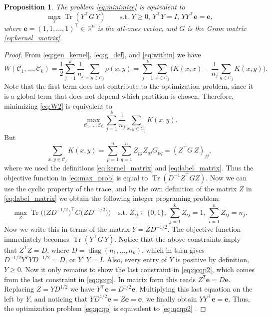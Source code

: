 \documentclass[aps,preprint,nofootinbib,floatfix]{revtex4-1}
\newtheorem{proposition}[theorem]{Proposition}
\DeclareMathOperator{\diag}{diag}
\DeclareMathOperator{\Tr}{Tr}
\newcommand\kk{K}
\newcommand\C{{\mathcal{C}}}
\newcommand\Zt{Y}
\begin{document}
\begin{proposition} 
\label{th:qcqp2}
The problem \eqref{eq:minimize} is equivalent to
\begin{equation}
\label{eq:qcqp2}
\max_{\Zt} \Tr \left( \Zt^\top G \, \Zt \right)  \qquad
\mbox{s.t. $\Zt \ge 0$, $\Zt^\top \Zt = I$, 
$\Zt \Zt^\top \bm{e} = \bm{e}$},
\end{equation}
where $\bm{e} = (1,1,\dots,1)^\top \in \mathbb{R}^n$ is the all-ones vector,
and $G$ is the Gram matrix \eqref{eq:kernel_matrix}.
\end{proposition}
\begin{proof}
From 
\eqref{eq:gen_kernel},
\eqref{eq:g_def}, and
\eqref{eq:within}
we have
\begin{equation}
\label{eq:W2}
W(\C_1,\dotsc,\C_k  )
= \dfrac{1}{2} \sum_{j=1}^k \dfrac{1}{n_j} \sum_{x,y \in \C_j} \rho(x,y)
= \sum_{j=1}^k \sum_{x \in \C_j}  \bigg(
\kk(x,x) - \dfrac{1}{n_j} \sum_{y \in \C_j} \kk(x,y) \bigg).
\end{equation}
Note that the first term does not contribute to the optimization problem,
since it is a global term that does not depend which partition is chosen. 
Therefore, minimizing \eqref{eq:W2} is equivalent to
\begin{equation}
\label{eq:max_prob}
\max_{ \C_1,\dotsc,\C_k } 
\sum_{j=1}^k \dfrac{1}{n_j} \sum_{x,y\in C_j} \kk(x,y) .
\end{equation}
But 
\begin{equation}
\sum_{x, y \in \C_j} \kk(x, y) =
\sum_{p=1}^{n} \sum_{q=1}^{n} Z_{pj} Z_{qj} G_{pq} = 
(Z^\top G \, Z)_{jj},
\end{equation}
where we used the definitions \eqref{eq:kernel_matrix} and
\eqref{eq:label_matrix}. Thus the objective function in 
\eqref{eq:max_prob} is equal to
$\Tr \left( D^{-1} Z^\top G Z \right)$. Now we can
use the cyclic property
of the trace, and by the own definition of the matrix $Z$
in \eqref{eq:label_matrix} we obtain the following integer
programing problem:
\begin{equation}\label{eq:qcqp}
\max_{Z} \Tr\Big( \big( Z D^{-1/2}\big)^\top G 
\big( ZD^{-1/2} \big) 
\Big) \quad
\mbox{s.t. $Z_{ij} \in \{0,1\}$, $\sum_{j=1}^k Z_{ij} = 1$, 
$\sum_{i=1}^n Z_{ij} = n_j$.}
\end{equation}
Now we write this in terms of the matrix $Y = Z D^{-1/2}$.
The objective function immediately becomes
$\Tr\left( Y^\top G \, Y\right)$. Notice that the above constraints
imply that $Z^T Z = D$, where $D=\diag(n_1,\dotsc,n_k)$, which in turn gives
$D^{-1/2} Y^T Y D^{-1/2} = D$, or $Y^\top Y = I$. 
Also, every entry of $Y$ is positive by definition,
$Y \ge 0$. Now it only remains to show the last 
constraint in \eqref{eq:qcqp2}, which comes from the last
constraint in \eqref{eq:qcqp}. In matrix form this reads
$Z^T \bm{e} = D \bm{e}$. Replacing $Z=YD^{1/2}$ we have
$Y^\top \bm{e} = D^{1/2} \bm{e}$. Multiplying this last equation
on the left by $Y$, and noticing
that $Y D^{1/2} \bm{e} = Z \bm{e} = \bm{e}$, we finally obtain
$Y Y^\top \bm{e} = \bm{e}$. Thus, the optimization 
problem \eqref{eq:qcqp} is equivalent
to \eqref{eq:qcqp2} .
\end{proof}
\end{document}
